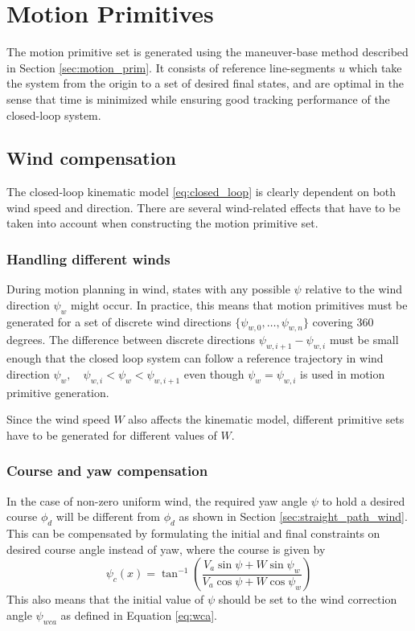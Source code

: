 \section{Motion Primitives}\label{sec:motion_prims_wind}
The motion primitive set is generated using the maneuver-base method described in Section \ref{sec:motion_prim}.  
It consists of reference line-segments $u$ which take the system from the origin to a set of desired final states, and are 
optimal in the sense that time is minimized while ensuring good tracking performance of the closed-loop system.
\subsection{Wind compensation}
The closed-loop kinematic model \eqref{eq:closed_loop} is clearly dependent on both wind speed and direction. There are several 
wind-related effects that have to be taken into account when constructing the motion primitive set.
\subsubsection{Handling different winds}
During motion planning in wind, states with any possible $\psi$ relative to the wind direction $\psi_w$ might occur. 
In practice, this means that motion primitives must be generated for a set of discrete wind directions $\{\psi_{w,0},\hdots,\psi_{w,n}\}$ covering 360 degrees. 
The difference between discrete directions $\psi_{w,i+1}-\psi_{w,i}$ must be small enough that the closed loop system can follow a reference trajectory in wind 
direction $\psi_w,\quad\psi_{w,i}<\psi_w<\psi_{w,i+1}$ even though $\psi_w=\psi_{w,i}$ is used in motion primitive generation.

Since the wind speed $W$ also affects the kinematic model, different primitive sets have to be generated for different values of $W$.
\subsubsection{Course and yaw compensation}
In the case of non-zero uniform wind, the required yaw angle $\psi$ to hold a desired 
course $\phi_d$ will be different from $\phi_d$ as shown in Section \ref{sec:straight_path_wind}. This can be compensated by 
formulating the initial and final constraints on desired course angle instead of yaw, where the course is given by 
\begin{equation}
    \psi_c(x) = \tan^{-1}\left(\frac{V_a\sin\psi + W\sin\psi_w}{V_a\cos\psi+W\cos\psi_w}\right)
\end{equation}
This also means that the initial value of $\psi$ should be set to the wind correction angle $\psi_{wca}$ as defined in Equation \eqref{eq:wca}.
